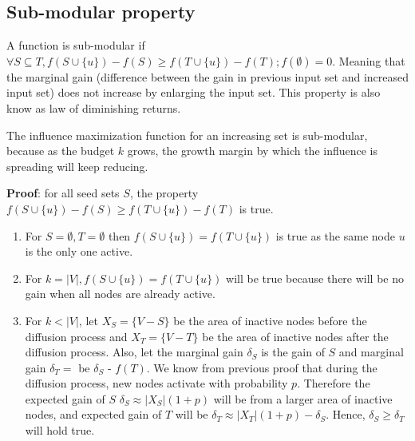		\subsection{Sub-modular property}
		\label{sec:proof-submodular}
		A function is sub-modular if $\forall S\subseteq T, f(S\cup \{u\})-f(S)\geq f(T\cup \{u\})-f(T);f(\emptyset)=0$. Meaning that the marginal gain (difference between the gain in previous input set and increased input set) does not increase by enlarging the input set. This property is also know as law of diminishing returns.
		
		The influence maximization function for an increasing set is sub-modular, because as the budget $k$ grows, the growth margin by which the influence is spreading will keep reducing.
		
		\textbf{Proof}: for all seed sets $S$, the property $f(S\cup \{u\})-f(S)\geq f(T\cup \{u\})-f(T)$ is true.
		
		\begin{enumerate}
			\item For $S=\emptyset,T=\emptyset$ then $f(S\cup \{u\})=f(T\cup \{u\})$ is true as the same node $u$ is the only one active.
			
			\item For $k=|V|,f(S\cup \{u\})=f(T\cup \{u\})$ will be true because there will be no gain when all nodes are already active.
			
			\item For $k<|V|$, let $X_S=\{V-S\}$ be the area of inactive nodes before the diffusion process and $X_T=\{V-T\}$ be the area of inactive nodes after the diffusion process. Also, let the marginal gain $\delta_S$ is the gain of $S$ and marginal gain $\delta_T=$ be $\delta_S$ - $f(T)$. We know from previous proof that during the diffusion process, new nodes activate with probability $p$. Therefore the expected gain of $S$ $\delta_S\approx |X_S|(1+p)$ will be from a larger area of inactive nodes, and expected gain of $T$ will be $\delta_T\approx |X_T|(1+p)-\delta_S$.
			Hence, $\delta_S\geq \delta_T$ will hold true.
		\end{enumerate}
	
	
